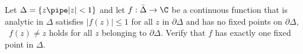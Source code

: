 Let $\Delta=\{z\pipe|z|<1\}$ and let $f:\bar{\Delta}\rightarrow \C$ be
a continuous function that is analytic in $\Delta$ satisfies
$|f(z)|\leq 1$ for all $z$ in $\partial \Delta$ and has no fixed
points on $\partial \Delta$, \ie\ $f(z)\neq z$ holds for all $z$
belonging to $\partial \Delta$. Verify that $f$ has exactly one fixed
point in $\Delta$.
